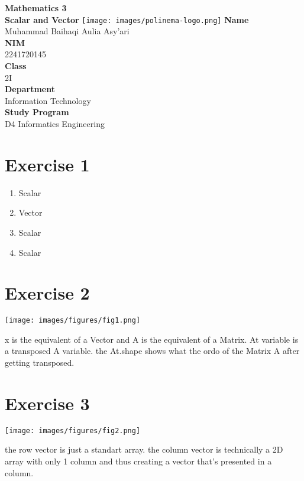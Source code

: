 \documentclass[12pt,titlepage]{article}
\newcommand{\vSubject}{Mathematics 3}
\newcommand{\vSubtitle}{Scalar and Vector}
\newcommand{\vName}{Muhammad Baihaqi Aulia Asy'ari}
\newcommand{\vNIM}{2241720145}
\newcommand{\vClass}{2I}
\newcommand{\vDepartment}{Information Technology}
\newcommand{\vStudyProgram}{D4 Informatics Engineering}
\begin{document}
\begin{titlepage}
    \centering
    \vfill
    {\bfseries\LARGE
        \vSubject\\
        \vskip0.25cm
        \vSubtitle
    }
    \vfill
    \texttt{[image: images/polinema-logo.png]}
    \vfill
    {
        \textbf{Name}\\
        \vName\\
        \vskip0.5cm
        \textbf{NIM}\\
        \vNIM\\
        \vskip0.5cm
        \textbf{Class}\\
        \vClass\\
        \vskip0.5cm
        \textbf{Department}\\
        \vDepartment\\
        \vskip0.5cm
        \textbf{Study Program}\\
        \vStudyProgram
    }
\end{titlepage}

\newpage

\section*{Exercise 1}
\begin{enumerate}
    \item Scalar
    \item Vector
    \item Scalar
    \item Scalar
\end{enumerate}

\section*{Exercise 2}
\begin{center}
    \texttt{[image: images/figures/fig1.png]}
\end{center}
x is the equivalent of a Vector and A is the equivalent of a Matrix. A\textunderscore t variable is a transposed A variable. the A\textunderscore t.shape shows what the ordo of the Matrix A after getting transposed.
\section*{Exercise 3}
\begin{center}
    \texttt{[image: images/figures/fig2.png]}
\end{center}
the row vector is just a standart array. the column vector is technically a 2D array with only 1 column and thus creating a vector that's presented in a column.
\end{document}
